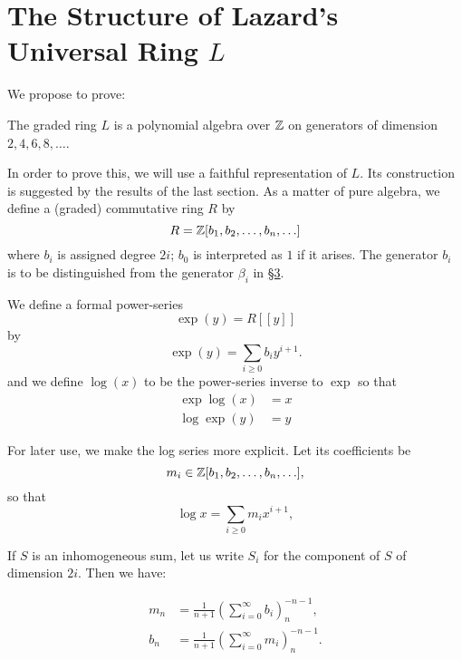 \documentclass[../main]{subfiles}
\begin{document}
\label{sec:p2c7}

\chapter{The Structure of Lazard's Universal Ring $L$}
We propose to prove: 

\begin{theorem}
\label{thm:p2c07.1}
The graded ring $L$ is a polynomial algebra over $\mathbb{Z}$ on generators of dimension $2, 4, 6, 8, \ldots$.
\end{theorem}

In order to prove this, we will use a faithful representation of $L$. Its construction is suggested by the results of the last section. As a matter of pure algebra, we define a (graded) commutative ring $R$ by $$R = \mathbb{Z}[b_1, b_2, \ldots, b_n, \ldots]$$ where $b_i$ is assigned degree $2i$; $b_0$ is interpreted as $1$ if it arises. The generator $b_i$ is to be distinguished from the generator $\beta_i$ in \hyperref[sec:p2c3]{\S 3}.

We define a formal power-series $$\exp(y) = R[\![y]\!]$$ by 
\begin{equation}
\tag{7.2} 
\label{eqn:p2c07.2}
\exp(y) = \sum_{i \ge 0} b_i y^{i + 1}.
\end{equation}
and we define $\log(x)$ to be the power-series inverse to $\exp$ so that
\begin{equation}
\tag{7.3}
\label{eqn:p2c07.3}
\begin{split}
\exp \log(x) & = x \\
\log \exp(y) & = y
\end{split}
\end{equation}

For later use, we make the log series more explicit. Let its coefficients be $$m_i \in \mathbb{Z} [b_1, b_2, \ldots, b_n, \ldots],$$ so that 
\begin{equation}
\tag{7.4}
\label{eqn:p2c07.4}
\log x = \sum_{i \ge 0} m_i x^{i + 1},
\end{equation}

If $S$ is an inhomogeneous sum, let us write $S_i$ for the component of $S$ of dimension $2i$. Then we have: 

\begin{proposition}
\label{prop:p2c07.5}
\begin{align*}m_n & = \frac 1 {n + 1} \left(\sum_{i = 0}^\infty b_i\right)_n^{-n-1}, \\ b_n & = \frac 1 {n + 1} \left(\sum_{i = 0}^\infty m_i\right)_n^{-n-1}.\end{align*}
\end{proposition}
\end{document}
